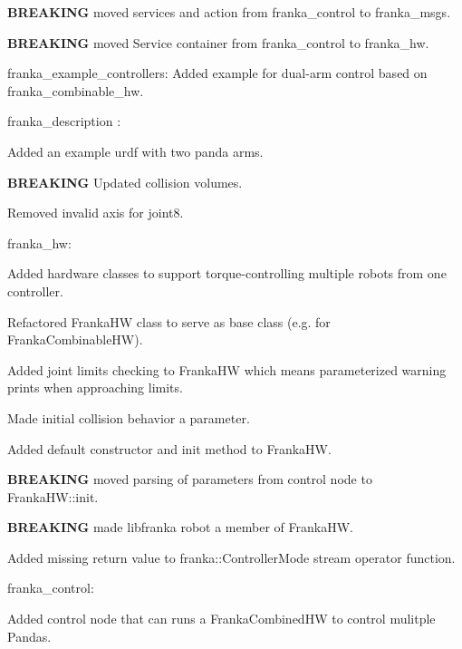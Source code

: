 \begin{DoxyItemize}
\item {\bfseries B\+R\+E\+A\+K\+I\+NG} moved services and action from {\ttfamily franka\+\_\+control} to {\ttfamily franka\+\_\+msgs}.
\item {\bfseries B\+R\+E\+A\+K\+I\+NG} moved Service container from {\ttfamily franka\+\_\+control} to {\ttfamily franka\+\_\+hw}.
\item {\ttfamily franka\+\_\+example\+\_\+controllers}\+: Added example for dual-\/arm control based on {\ttfamily franka\+\_\+combinable\+\_\+hw}.
\item {\ttfamily franka\+\_\+description} \+:
\begin{DoxyItemize}
\item Added an example urdf with two panda arms.
\item {\bfseries B\+R\+E\+A\+K\+I\+NG} Updated collision volumes.
\item Removed invalid {\ttfamily axis} for {\ttfamily joint8}.
\end{DoxyItemize}
\item {\ttfamily franka\+\_\+hw}\+:
\begin{DoxyItemize}
\item Added hardware classes to support torque-\/controlling multiple robots from one controller.
\item Refactored Franka\+HW class to serve as base class (e.\+g. for Franka\+Combinable\+HW).
\item Added joint limits checking to Franka\+HW which means parameterized warning prints when approaching limits.
\item Made initial collision behavior a parameter.
\item Added default constructor and init method to Franka\+HW.
\item {\bfseries B\+R\+E\+A\+K\+I\+NG} moved parsing of parameters from control node to Franka\+H\+W\+::init.
\item {\bfseries B\+R\+E\+A\+K\+I\+NG} made libfranka robot a member of Franka\+HW.
\item Added missing return value to {\ttfamily franka\+::\+Controller\+Mode} stream operator function.
\end{DoxyItemize}
\item {\ttfamily franka\+\_\+control}\+:
\begin{DoxyItemize}
\item Added control node that can runs a {\ttfamily Franka\+Combined\+HW} to control mulitple Pandas.

\end{DoxyItemize}
\end{DoxyItemize}
